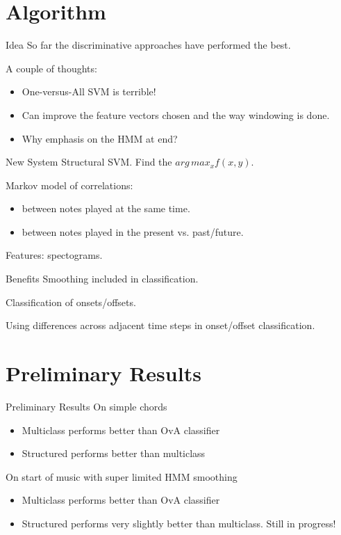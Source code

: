 \documentclass{beamer}
\begin{document}
\section{Algorithm}
\begin{frame}{Idea}
So far the discriminative approaches have performed the best.\\
\vspace{.5cm}

\pause
A couple of thoughts:
\begin{itemize}
\item One-versus-All SVM is terrible!
\item Can improve the feature vectors chosen and the way windowing is done.
\item Why emphasis on the HMM at end? %
\end{itemize}
\end{frame}

\begin{frame}{New System}
Structural SVM. Find the $arg\,max_{x} f(x,y)$.

\vspace{1em}
Markov model of correlations:
\begin{itemize}
\item between notes played at the same time.
\item between notes played in the present vs. past/future.
\end{itemize}

\vspace{1em}
Features: spectograms.
\end{frame}

\begin{frame}{Benefits}
Smoothing included in classification.

\vspace{1em}
Classification of onsets/offsets.

\vspace{1em}
Using differences across adjacent time steps in onset/offset classification.
\end{frame}

\section{Preliminary Results}
\begin{frame}{Preliminary Results}
On simple chords
\begin{itemize}
\item Multiclass performs better than OvA classifier
\item Structured performs better than multiclass
\end{itemize}

On start of music with super limited HMM smoothing
\begin{itemize}
\item Multiclass performs better than OvA classifier
\item Structured performs very slightly better than multiclass. Still in progress!
\end{itemize}
\end{frame}
\end{document}
